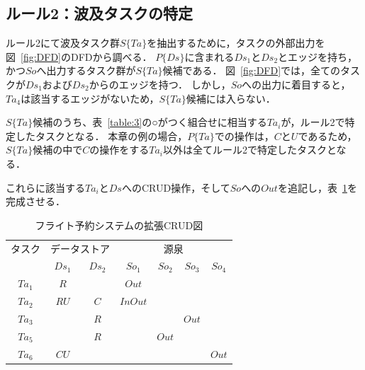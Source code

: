 \documentclass[a4paper,12pt]{jreport}
\begin{document}
\subsection{ルール2：波及タスクの特定}
ルール2にて波及タスク群$S\{Ta\}$を抽出するために，タスクの外部出力を図~\ref{fig:DFD}のDFDから調べる．
$P\{Ds\}$に含まれる$Ds_1$と$Ds_2$とエッジを持ち，かつ$So$へ出力するタスク群が$S\{Ta\}$候補である．
図~\ref{fig:DFD}では，全てのタスクが$Ds_1$および$Ds_2$からのエッジを持つ．
しかし，$So$への出力に着目すると，$Ta_4$は該当するエッジがないため，$S\{Ta\}$候補には入らない．

$S\{Ta\}$候補のうち、表~\ref{table:3}の○がつく組合せに相当する$Ta_i$が，ルール2で特定したタスクとなる．
本章の例の場合，$P\{Ta\}$での操作は，$C$と$U$であるため，$S\{Ta\}$候補の中で$C$の操作をする$Ta_i$以外は全てルール2で特定したタスクとなる．

これらに該当する$Ta_i$と$Ds$へのCRUD操作，そして$So$への$Out$を追記し，表~\ref{ECRUD2}を完成させる．

\begin{table}[t]
\caption{フライト予約システムの拡張CRUD図}
\label{ECRUD2}
\begin{center}
\begin{tabular}{c||c|c||c|c|c|c}
\hline
タスク&\multicolumn{2}{c||}{データストア}&\multicolumn{4}{c}{源泉}\\
&$Ds_1$&$Ds_2$&$So_1$&$So_2$&$So_3$&$So_4$\\
\hline\hline
$Ta_1$&$R$&&$Out$&&&\\
\hline
$Ta_2$&$RU$&$C$&$InOut$&&&\\
\hline
$Ta_3$&&$R$&&&$Out$&\\
\hline
$Ta_5$&&$R$&&$Out$&&\\
\hline
$Ta_6$&$CU$&&&&&$Out$\\
\hline
\end{tabular}
\end{center}　
\end{table}%
\end{document}
